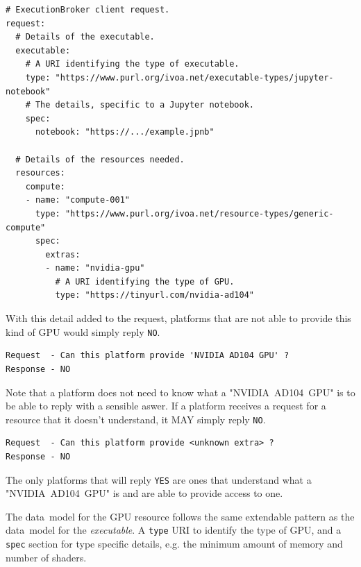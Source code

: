 \documentclass[11pt,a4paper]{ivoa}
\newcommand{\datamodel} {data~model}
\newcommand{\codeword}[1] {\texttt{#1}}
\newcommand{\executable} {\textit{executable}}
\newcommand{\gpu} {GPU}
\newcommand{\nvidiagpu} {NVIDIA~AD104~GPU}
\begin{document}
\begin{lstlisting}[]
# ExecutionBroker client request.
request:
  # Details of the executable.
  executable:
    # A URI identifying the type of executable.
    type: "https://www.purl.org/ivoa.net/executable-types/jupyter-notebook"
    # The details, specific to a Jupyter notebook.
    spec:
      notebook: "https://.../example.jpnb"

  # Details of the resources needed.
  resources:
    compute:
    - name: "compute-001"
      type: "https://www.purl.org/ivoa.net/resource-types/generic-compute"
      spec:
        extras:
        - name: "nvidia-gpu"
          # A URI identifying the type of GPU.
          type: "https://tinyurl.com/nvidia-ad104"
\end{lstlisting}

With this detail added to the request, platforms that are not able to provide this kind of \gpu{}
would simply reply \codeword{NO}.

\begin{lstlisting}[]
Request  - Can this platform provide 'NVIDIA AD104 GPU' ?
Response - NO
\end{lstlisting}

Note that a platform does not need to know what a  "\nvidiagpu{}" is to be able to reply with a sensible aswer.
If a platform receives a request for a resource that it doesn't understand, it MAY simply reply \codeword{NO}.

\begin{lstlisting}[]
Request  - Can this platform provide <unknown extra> ?
Response - NO
\end{lstlisting}

The only platforms that will reply \codeword{YES} are ones that understand what a "\nvidiagpu{}"
is and are able to provide access to one.

The \datamodel{} for the \gpu{} resource follows the same extendable pattern as the \datamodel{} for
the \executable{}. A \codeword{type} URI to identify the type of \gpu{},
and a \codeword{spec} section for type specific details,
e.g. the minimum amount of memory and number of shaders.
\end{document}
